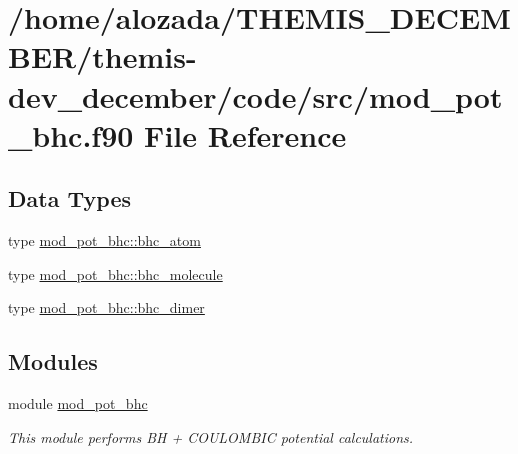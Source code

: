\hypertarget{mod__pot__bhc_8f90}{}\section{/home/alozada/\+T\+H\+E\+M\+I\+S\+\_\+\+D\+E\+C\+E\+M\+B\+E\+R/themis-\/dev\+\_\+december/code/src/mod\+\_\+pot\+\_\+bhc.f90 File Reference}
\label{mod__pot__bhc_8f90}
\subsection*{Data Types}
\begin{DoxyCompactItemize}
\item 
type \hyperlink{structmod__pot__bhc_1_1bhc__atom}{mod\+\_\+pot\+\_\+bhc\+::bhc\+\_\+atom}
\item 
type \hyperlink{structmod__pot__bhc_1_1bhc__molecule}{mod\+\_\+pot\+\_\+bhc\+::bhc\+\_\+molecule}
\item 
type \hyperlink{structmod__pot__bhc_1_1bhc__dimer}{mod\+\_\+pot\+\_\+bhc\+::bhc\+\_\+dimer}
\end{DoxyCompactItemize}
\subsection*{Modules}
\begin{DoxyCompactItemize}
\item 
module \hyperlink{namespacemod__pot__bhc}{mod\+\_\+pot\+\_\+bhc}
\begin{DoxyCompactList}\small\item\em This module performs BH + C\+O\+U\+L\+O\+M\+B\+IC potential calculations. \end{DoxyCompactList}\end{DoxyCompactItemize}
